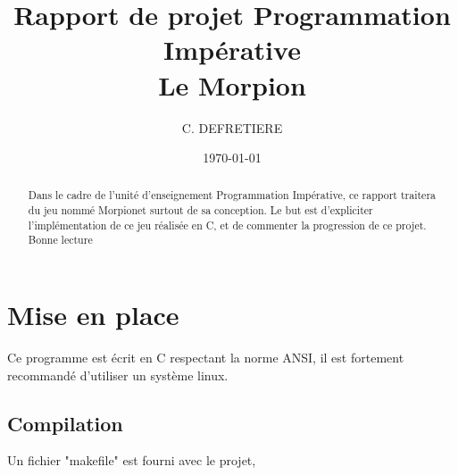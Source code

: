 \documentclass[a4paper, 11pt]{article}
\title{Rapport de projet \og Programmation Impérative\fg \\ Le Morpion}
\author{C. DEFRETIERE}
\date{\today}
\begin{document}
\maketitle

\begin{abstract}
  Dans le cadre de l'unité d'enseignement \og Programmation Impérative\fg , ce rapport traitera du jeu nommé \og Morpion\fg et surtout de sa conception. Le but est d'expliciter l'implémentation de ce jeu réalisée en C, et de commenter la progression de ce projet.
\\

Bonne lecture
\end{abstract}

\newpage

\tableofcontents

\newpage

\section{Mise en place}

Ce programme est écrit en C respectant la norme ANSI, il est fortement recommandé d'utiliser un système linux.

\subsection{Compilation}
Un fichier "makefile" est fourni avec le projet, 

\end{document}
